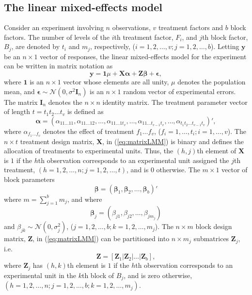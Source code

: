 \documentclass[article]{jss}
\newcommand{\I}{\mathbf{I}}
\newcommand{\Z}{\mathbf{Z}}
\newcommand{\X}{\mathbf{X}}
\begin{document}
\subsection{The linear mixed-effects model}
\label{subsec:matrixLMM}
Consider an experiment involving $n$ observations, $v$ treatment factors and $b$ block factors. The number of levels of the $i$th treatment factor, $F_i$, and $j$th block factor, $B_j$, are denoted by $t_i$ and $m_j$, respectively, ($i = 1,2, \dots, v; j = 1,2,\dots, b$). Letting $\bm{y}$ be an $n \times 1$ vector of responses, the linear mixed-effects model for the experiment can be written in matrix notation as
\begin{equation}\label{eq:matrixLMM}
\bm{y} = \mathbf{1}\mu + \X \bm{\alpha} + \Z\bm{\beta} + \bm{\epsilon},
\end{equation}
where $\mathbf{1}$ is an $n \times 1$ vector whose elements are all unity, $\mu$ denotes the population mean, and $\bm{\epsilon}\sim \mathcal{N}(0,\sigma^2 \I_n)$ is an $n \times 1$ random vector of experimental errors. The matrix $\I_n$ denotes the $n \times n$ identity matrix. The treatment parameter vector of length $t = t_1 t_2  \dots  t_v$ is defined as 
\begin{equation}
\label{eq:treatPar}
\bm{\alpha} = (\alpha_{11 \dots 11}, \alpha_{11 \dots 12}, \dots,  \alpha_{1 1 \dots 1t_v},\dots,\alpha_{1 1 \dots t_{v-1}t_v},\dots,\alpha_{t_1 t_2 \dots t_{v-1}t_v})',
\end{equation}
where $\alpha_{f_1 \dots f_v}$ denotes the effect of treatment $f_1 \dots f_v$, ($f_i = 1, \dots, t_i; i = 1,\dots, v$). The $n \times t$ treatment design matrix, $\X$, in (\ref{eq:matrixLMM}) is binary and defines the allocation of treatments to experimental units. Thus, the $(h,j)$th element of $\X$ is $1$ if the $h$th observation corresponds to an experimental unit assigned the $j$th treatment, $(h=1,2,\dots,n; j=1,2,\dots, t)$, and is $0$ otherwise. The $m \times 1$ vector of block parameters 
\begin{equation}\label{eq:block1Par}
\bm{\beta} = (\bm{\beta}_1, \bm{\beta}_2, \ldots, \bm{\beta}_b)'
\end{equation} 
where $m=\sum_{j=1}^{b}m_j$, and where
\[
\bm{\beta}_j = (\beta_{j1}, \beta_{j2}, \dots, \beta_{j m_j})
\]
and 
$\beta_{jk} \sim \mathcal{N}(0, \sigma_j^2)$, ($j=1,2,\dots,b; k=1,2,\dots, m_j$). The $n \times m$ block design matrix, $\Z$, in (\ref{eq:matrixLMM}) can be partitioned into $n \times m_j$ submatrices $\Z_j$, i.e.\ 
\begin{equation}\label{eq:block1Mat}
\Z = [\Z_1 \vert \Z_2 \vert \ldots \vert \Z_b],
\end{equation}
where $\Z_j$ has $(h,k)$th element is $1$ if the $h$th observation corresponds to an experimental unit in the $k$th block of $B_j$, and is zero otherwise, $(h=1,2,\dots,n; j=1,2,\dots,b; k=1,2,\dots, m_j)$. 
\end{document}
